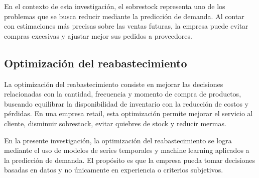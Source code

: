 En el contexto de esta investigación, el sobrestock representa uno de los problemas que se busca reducir mediante la predicción de demanda. Al contar con estimaciones más precisas sobre las ventas futuras, la empresa puede evitar compras excesivas y ajustar mejor sus pedidos a proveedores.

\subsection{Optimización del reabastecimiento}

La optimización del reabastecimiento consiste en mejorar las decisiones relacionadas con la cantidad, frecuencia y momento de compra de productos, buscando equilibrar la disponibilidad de inventario con la reducción de costos y pérdidas. En una empresa retail, esta optimización permite mejorar el servicio al cliente, disminuir sobrestock, evitar quiebres de stock y reducir mermas.

En la presente investigación, la optimización del reabastecimiento se logra mediante el uso de modelos de series temporales y machine learning aplicados a la predicción de demanda. El propósito es que la empresa pueda tomar decisiones basadas en datos y no únicamente en experiencia o criterios subjetivos.

